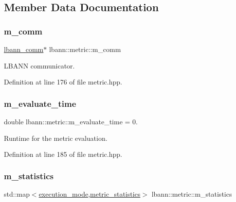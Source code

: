 \subsection{Member Data Documentation}
\mbox{\label{classlbann_1_1metric_a547077709911e30c7d070545936c9c85}} 
\subsubsection{\texorpdfstring{m\+\_\+comm}{m\_comm}}
{\footnotesize\ttfamily \hyperlink{classlbann_1_1lbann__comm}{lbann\+\_\+comm}$\ast$ lbann\+::metric\+::m\+\_\+comm\hspace{0.3cm}{\ttfamily [private]}}

L\+B\+A\+NN communicator. 

Definition at line 176 of file metric.\+hpp.

\mbox{\label{classlbann_1_1metric_a4c77a1bd1db77e9d837a72128e3d687f}} 
\subsubsection{\texorpdfstring{m\+\_\+evaluate\+\_\+time}{m\_evaluate\_time}}
{\footnotesize\ttfamily double lbann\+::metric\+::m\+\_\+evaluate\+\_\+time = 0.\hspace{0.3cm}{\ttfamily [private]}}

Runtime for the metric evaluation. 

Definition at line 185 of file metric.\+hpp.

\mbox{\label{classlbann_1_1metric_a9949d8aceedbc113aa2c356046ed73fc}} 
\subsubsection{\texorpdfstring{m\+\_\+statistics}{m\_statistics}}
{\footnotesize\ttfamily std\+::map$<$\hyperlink{base_8hpp_a2781a159088df64ed7d47cc91c4dc0a8}{execution\+\_\+mode},\hyperlink{structlbann_1_1metric__statistics}{metric\+\_\+statistics}$>$ lbann\+::metric\+::m\+\_\+statistics\hspace{0.3cm}{\ttfamily [private]}}

